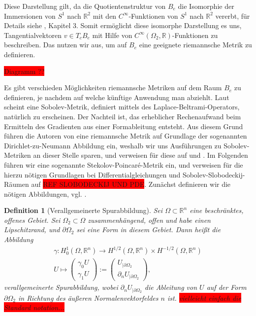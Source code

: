 \documentclass[bibliography=totoc,12pt,a4paper]{scrartcl}
\theoremstyle{exampstyle}
\newtheorem{defi}{Definition}%
\numberwithin{equation}{section}
\begin{document}
Diese Darstellung gilt, da die Quotientenstruktur von $B_e$ die Isomorphie der Immersionen von $S^1$ nach $\mathbb{R}^2$ mit den $C^\infty$-Funktionen von $S^1$ nach $\mathbb{R}^2$ vererbt, für Details siehe \cite{shape_space}, Kapitel 3.
Somit ermöglicht diese isomorphe Darstellung es uns, Tangentialvektoren $v \in T_cB_e$ mit Hilfe von $C^\infty(\Omega_2, \mathbb{R})$-Funktionen zu beschreiben. Das nutzen wir aus, um auf $B_e$ eine geeignete riemannsche Metrik zu definieren.

\colorbox{red}{Diagramm ??}

Es gibt verschieden Möglichkeiten riemannsche Metriken auf dem Raum $B_e$ zu definieren, je nachdem auf welche künftige Anwendung man abziehlt. Laut \cite{shape_space} scheint eine Sobolev-Metrik, definiert mittels des Laplace-Beltrami-Operators, natürlich zu erscheinen. Der Nachteil ist, das erheblicher Rechenaufwand beim Ermitteln des Gradienten aus einer Formableitung entsteht. Aus diesem Grund führen die Autoren von \cite{bfgs1} eine riemannsche Metrik auf Grundlage der sogenannten Dirichlet-zu-Neumann Abbildung ein, weshalb wir uns Ausführungen zu Sobolev-Metriken an dieser Stelle sparen, und verweisen für diese auf \cite{bfgs1} und \cite{shape_space}. Im Folgenden führen wir eine sogenannte Stekolov-Poincaré-Metrik ein, und verweisen für die hierzu nötigen Grundlagen bei Differentialgleichungen und Sobolev-Slobodeckij-Räumen auf \colorbox{red}{REF SLOBODECKIJ UND PDE}. Zunächst definieren wir die nötigen Abbildungen, vgl. \cite{bfgs1}.

\begin{defi}[Verallgemeinerte Spurabbildung]\label{Sproperatoren}
Sei $\Omega \subset \mathbb{R}^n$ eine beschränktes, offenes Gebiet. Sei $\Omega_2 \subset \Omega$ zusammenhängend, offen und habe einen Lipschitzrand, und $\partial \Omega_2$ sei eine Form in diesem Gebiet. Dann heißt die Abbildung
\begin{align*}
	\gamma: H^{1}_0(\Omega, \mathbb{R}^n) \rightarrow H^{1/2}(\Omega, \mathbb{R}^n)\times H^{-1/2}(\Omega, \mathbb{R}^n) \\
	U \mapsto 
	\left(\begin{matrix}
	\gamma_0 U \\ \gamma_1 U
	\end{matrix}\right)
	:= \left(\begin{matrix}
	U_{\vert \partial\Omega_2} \\ \partial_n U_{\vert \partial\Omega_2}
	\end{matrix}\right),
\end{align*}
\textit{verallgemeinerte Spurabbildung}, wobei $\partial_n U_{\vert\partial\Omega_2}$ die Ableitung von $U$ auf der Form $\partial \Omega_2$ in Richtung des äußeren Normalenvektorfeldes $n$ ist. \colorbox{red}{vielleicht einfach die Standard notation...}
\end{defi}
\end{document}
